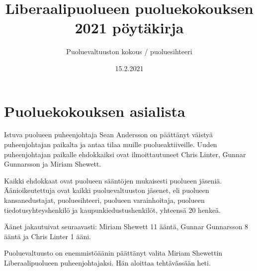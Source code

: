\documentclass{article}
\title{Liberaalipuolueen puoluekokouksen 2021 pöytäkirja}
\author{Puoluevaltuuston kokous / puoluesihteeri}
\date{15.2.2021}
\begin{document}
	
	\maketitle
	
	\section{Puoluekokouksen asialista}
	
	Istuva puolueen puheenjohtaja Sean Andersson on päättänyt väistyä puheenjohtajan paikalta ja antaa tilaa muille puolueaktiiveille. Uuden puheenjohtajan paikalle ehdokkaiksi ovat ilmoittautuneet Chris Linter, Gunnar Gunnarsson ja Miriam Shewett.
	
	\vspace{12pt}
	Kaikki ehdokkaat ovat puolueen sääntöjen mukaisesti puolueen jäseniä. Äänioikeutettuja ovat kaikki puoluevaltuuston jäsenet, eli puolueen kansanedustajat, puoluesihteeri, puolueen varainhoitaja, puolueen tiedotusyhteyshenkilö ja kaupunkiedustushenkilöt, yhteensä 20 henkeä.
	
	\vspace{12pt}
	Äänet jakautuivat seuraavasti: Miriam Shewett 11 ääntä, Gunnar Gunnarsson 8 ääntä ja Chris Linter 1 ääni.
	
	\vspace*{12pt}
	Puoluevaltuusto on enemmistöäänin päättänyt valita Miriam Shewettin Liberaalipuolueen puheenjohtajaksi. Hän aloittaa tehtävässään heti.
\end{document}
